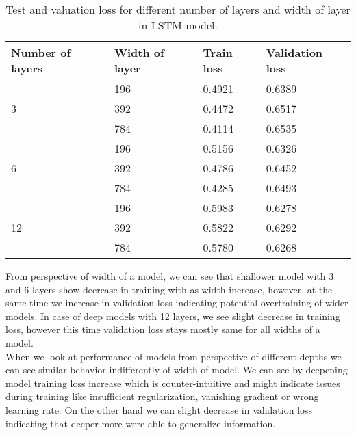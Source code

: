 \begin{table}[]
	\centering
	\begin{tabular}{|l|l|l|l|}
		\hline
		Number of layers    & Width of layer & Train loss & Validation loss \\ \hline
		\multirow{3}{*}{3}  & 196               &  0.4921         & 0.6389                \\ \cline{2-4} 
		& 392              &  0.4472         & 0.6517                \\ \cline{2-4} 
		& 784              & 0.4114          & 0.6535                \\ \hline
		\multirow{3}{*}{6}  & 196               & 0.5156          & 0.6326                \\ \cline{2-4} 
		& 392              & 0.4786          &   0.6452              \\ \cline{2-4} 
		& 784              & 0.4285          &  0.6493               \\ \hline
		\multirow{3}{*}{12} & 196               & 0.5983          & 0.6278                \\ \cline{2-4} 
		& 392              & 0.5822          & 0.6292                \\ \cline{2-4} 
		& 784              & 0.5780          & 0.6268                \\ \hline
	\end{tabular}
	\caption{Test and valuation loss for different number of layers and width of layer in LSTM model.}
	\label{tab:lstm_train}
\end{table}

From perspective of width of a model, we can see that shallower model with 3 and 6 layers show decrease in training with as width increase, however, at the same time we increase in validation loss indicating potential overtraining of wider models. In case of deep models with 12 layers, we see slight decrease in training loss, however this time validation loss stays mostly same for all widths of a model. 
\\

When we look at performance of models from perspective of different depths we can see similar behavior indifferently of width of model. We can see by deepening model training loss increase which is counter-intuitive and might indicate issues during training like insufficient regularization, vanishing gradient or wrong learning rate. On the other hand we can slight decrease in validation loss indicating that deeper more were able to generalize information.
\\

